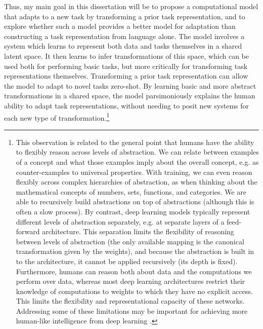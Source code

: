 Thus, my main goal in this dissertation will be to propose a computational model that adapts to a new task by transforming a prior task representation, and to explore whether such a model provides a better model for adaptation than constructing a task representation from language alone. The model involves a system which learns to represent both data and tasks themselves in a shared latent space. It then learns to infer transformations of this space, which can be used both for performing basic tasks, but more critically for transforming task representations themselves. Transforming a prior task representation can allow the model to adapt to novel tasks zero-shot. By learning basic and more abstract transformations in a shared space, the model parsimoniously explains the human ability to adapt task representations, without needing to posit new systems for each new type of transformation.\footnote{This observation is related to the general point that humans have the ability to flexibly reason across levels of abstraction. We can relate between examples of a concept and what those examples imply about the overall concept, e.g. as counter-examples to universal properties. With training, we can even reason flexibly across complex hierarchies of abstraction, as when thinking about the mathematical concepts of numbers, sets, functions, and categories. We are able to recursively build abstractions on top of abstractions (although this is often a slow process). By contrast, deep learning models typically represent different levels of abstraction separately, e.g. at separate layers of a feed-forward architecture. This separation limits the flexibility of reasoning between levels of abstraction (the only available mapping is the canonical transformation given by the weights), and because the abstraction is built in to the architecture, it cannot be applied recursively (its depth is fixed). Furthermore, humans can reason both about data and the computations we perform over data, whereas most deep learning architectures restrict their knowledge of computations to weights to which they have no explicit access. This limits the flexibility and representational capacity of these networks. Addressing some of these limitations may be important for achieving more human-like intelligence from deep learning \citep[c.f.][]{Chollet2019}.} \par 
